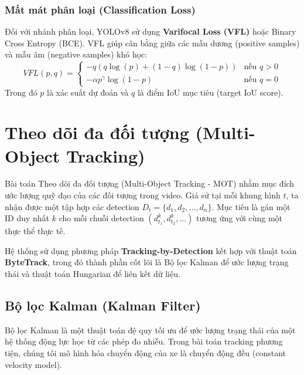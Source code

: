 \subsubsection{Mất mát phân loại (Classification Loss)}
Đối với nhánh phân loại, YOLOv8 sử dụng \textbf{Varifocal Loss (VFL)} hoặc Binary Cross Entropy (BCE). VFL giúp cân bằng giữa các mẫu dương (positive samples) và mẫu âm (negative samples) khó học:
\begin{equation}
    VFL(p, q) = \begin{cases}
    -q (q \log(p) + (1-q) \log(1-p)) & \text{nếu } q > 0 \\
    -\alpha p^\gamma \log(1-p) & \text{nếu } q = 0
    \end{cases}
\end{equation}
Trong đó $p$ là xác suất dự đoán và $q$ là điểm IoU mục tiêu (target IoU score).

\section{Theo dõi đa đối tượng (Multi-Object Tracking)}
\label{sec:tracking_theory}

Bài toán Theo dõi đa đối tượng (Multi-Object Tracking - MOT) nhằm mục đích ước lượng quỹ đạo của các đối tượng trong video. Giả sử tại mỗi khung hình $t$, ta nhận được một tập hợp các detection $D_t = \{d_1, d_2, \dots, d_n\}$. Mục tiêu là gán một ID duy nhất $k$ cho mỗi chuỗi detection $(d_{t_1}^k, d_{t_2}^k, \dots)$ tương ứng với cùng một thực thể thực tế.

Hệ thống sử dụng phương pháp \textbf{Tracking-by-Detection} kết hợp với thuật toán \textbf{ByteTrack}, trong đó thành phần cốt lõi là Bộ lọc Kalman để ước lượng trạng thái và thuật toán Hungarian để liên kết dữ liệu.

\subsection{Bộ lọc Kalman (Kalman Filter)}
Bộ lọc Kalman là một thuật toán đệ quy tối ưu để ước lượng trạng thái của một hệ thống động lực học từ các phép đo nhiễu. Trong bài toán tracking phương tiện, chúng tôi mô hình hóa chuyển động của xe là chuyển động đều (constant velocity model).

